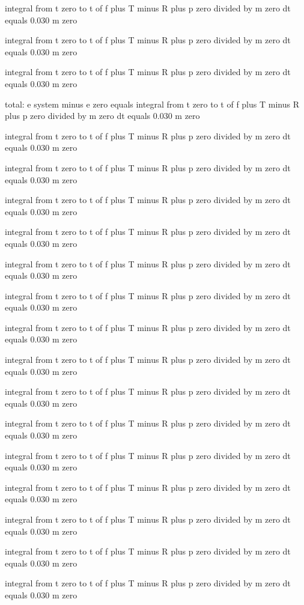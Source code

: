 integral from t zero to t of f plus T minus R plus p zero divided by m zero dt equals 0.030 m zero

integral from t zero to t of f plus T minus R plus p zero divided by m zero dt equals 0.030 m zero

integral from t zero to t of f plus T minus R plus p zero divided by m zero dt equals 0.030 m zero

total: e system minus e zero equals integral from t zero to t of f plus T minus R plus p zero divided by m zero dt equals 0.030 m zero

integral from t zero to t of f plus T minus R plus p zero divided by m zero dt equals 0.030 m zero

integral from t zero to t of f plus T minus R plus p zero divided by m zero dt equals 0.030 m zero

integral from t zero to t of f plus T minus R plus p zero divided by m zero dt equals 0.030 m zero

integral from t zero to t of f plus T minus R plus p zero divided by m zero dt equals 0.030 m zero

integral from t zero to t of f plus T minus R plus p zero divided by m zero dt equals 0.030 m zero

integral from t zero to t of f plus T minus R plus p zero divided by m zero dt equals 0.030 m zero

integral from t zero to t of f plus T minus R plus p zero divided by m zero dt equals 0.030 m zero

integral from t zero to t of f plus T minus R plus p zero divided by m zero dt equals 0.030 m zero

integral from t zero to t of f plus T minus R plus p zero divided by m zero dt equals 0.030 m zero

integral from t zero to t of f plus T minus R plus p zero divided by m zero dt equals 0.030 m zero

integral from t zero to t of f plus T minus R plus p zero divided by m zero dt equals 0.030 m zero

integral from t zero to t of f plus T minus R plus p zero divided by m zero dt equals 0.030 m zero

integral from t zero to t of f plus T minus R plus p zero divided by m zero dt equals 0.030 m zero

integral from t zero to t of f plus T minus R plus p zero divided by m zero dt equals 0.030 m zero

integral from t zero to t of f plus T minus R plus p zero divided by m zero dt equals 0.030 m zero

